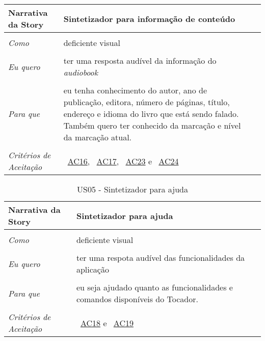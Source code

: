 \begin{apendicesenv}
\begin{table}[ht]
\begin{center}
\begin{tabularx}{\textwidth}{|lX|l|}
\hline 
\textbf{Narrativa da Story} & Sintetizador para informação de conteúdo \\
\hline
 & \\
\textit{Como} & deficiente visual \\
 & \\
\textit{Eu quero} & ter uma resposta audível da informação do \textit{audiobook} \\
 & \\
\textit{Para que} & eu tenha conhecimento do autor, ano de publicação, editora, número de páginas, título, endereço e idioma do livro que está sendo falado. Também quero ter conhecido da marcação e nível da marcação atual. \\
 & \\
\hline
\textit{Critérios de Aceitação} & ~\hyperref[tab:us01a16]{AC16},  ~\hyperref[tab:us01a17]{AC17}, ~\hyperref[tab:us01a23]{AC23} e ~\hyperref[tab:us01a24]{AC24} \\
\hline

\end{tabularx}
\end{center}
\label{tab:us04}
\end{table}

\begin{table}[ht]
\centering
\caption{US05 - Sintetizador para ajuda}
\vspace{0.1cm}
\begin{center}
\begin{tabularx}{\textwidth}{|lX|l|}

\hline 
\textbf{Narrativa da Story} & Sintetizador para ajuda \\
\hline
 & \\
\textit{Como} & deficiente visual \\
 & \\
\textit{Eu quero} & ter uma respota audível das funcionalidades da aplicação \\
 & \\
\textit{Para que} & eu seja ajudado quanto as funcionalidades e comandos disponíveis do Tocador. \\
 & \\
\hline
\textit{Critérios de Aceitação} & ~\hyperref[tab:us01a18]{AC18} e ~\hyperref[tab:us01a19]{AC19} \\
\hline

\end{tabularx}
\end{center}
\label{tab:us05}
\end{table}


\end{apendicesenv}
